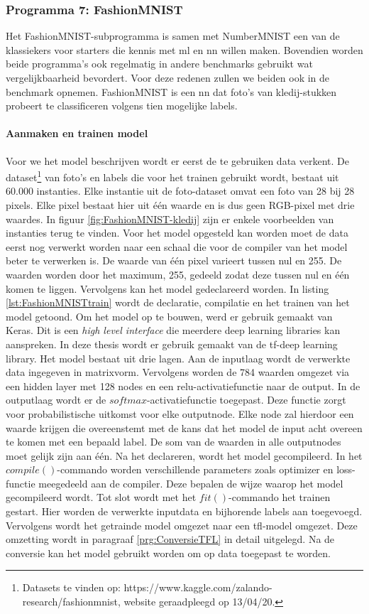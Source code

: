 		\subsubsection{Programma 7: FashionMNIST} \label{prg:FashionMNIST}
		Het FashionMNIST-subprogramma is samen met NumberMNIST een van de klassiekers voor starters die kennis met \gls{ml} en \gls{nn} willen maken. Bovendien worden beide programma's ook regelmatig in andere benchmarks gebruikt wat vergelijkbaarheid bevordert. Voor deze redenen zullen we beiden ook in de benchmark opnemen. FashionMNIST is een \gls{nn} dat foto's van kledij-stukken probeert te classificeren volgens tien mogelijke labels. 
		
			\paragraph{Aanmaken en trainen model}
			Voor we het model beschrijven wordt er eerst de te gebruiken data verkent. De dataset\footnote{Datasets te vinden op: https://www.kaggle.com/zalando-research/fashionmnist, website geraadpleegd op 13/04/20.} van foto's en labels die voor het trainen gebruikt wordt, bestaat uit 60.000 instanties. Elke instantie uit de foto-dataset omvat een foto van 28 bij 28 pixels. Elke pixel bestaat hier uit \'e\'en waarde en is dus geen RGB-pixel met drie waardes. In figuur \ref{fig:FashionMNIST-kledij} zijn er enkele voorbeelden van instanties terug te vinden. Voor het model opgesteld kan worden moet de data eerst nog verwerkt worden naar een schaal die voor de compiler van het model beter te verwerken is. De waarde van \'e\'en pixel varieert tussen nul en 255. De waarden worden door het maximum, 255, gedeeld zodat deze tussen nul en \'e\'en komen te liggen. Vervolgens kan het model gedeclareerd worden. In listing \ref{lst:FashionMNISTtrain} wordt de declaratie, compilatie en het trainen van het model getoond. Om het model op te bouwen, werd er gebruik gemaakt van Keras. Dit is een \textit{high level interface} die meerdere deep learning libraries kan aanspreken. In deze thesis wordt er gebruik gemaakt van de \gls{tf}-deep learning library. Het model bestaat uit drie lagen. Aan de inputlaag wordt de verwerkte data ingegeven in matrixvorm. Vervolgens worden de 784 waarden omgezet via een hidden layer met 128 nodes en een relu-activatiefunctie naar de output. In de outputlaag wordt er de $softmax$-activatiefunctie toegepast. Deze functie zorgt voor probabilistische uitkomst voor elke outputnode. Elke node zal hierdoor een waarde krijgen die overeenstemt met de kans dat het model de input acht overeen te komen met een bepaald label. De som van de waarden in alle outputnodes moet gelijk zijn aan \'e\'en. Na het declareren, wordt het model gecompileerd. In het $compile()$-commando worden verschillende parameters zoals optimizer en loss-functie meegedeeld aan de compiler. Deze bepalen de wijze waarop het model gecompileerd wordt. Tot slot wordt met het $fit()$-commando het trainen gestart. Hier worden de verwerkte inputdata en bijhorende labels aan toegevoegd. Vervolgens wordt het getrainde model omgezet naar een \gls{tfl}-model omgezet. Deze omzetting wordt in paragraaf \ref{prg:ConversieTFL} in detail uitgelegd. Na de conversie kan het model gebruikt worden om op data toegepast te worden. 
			
